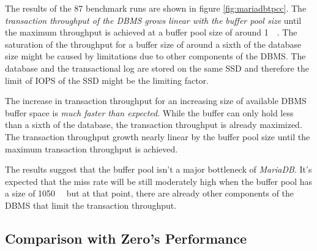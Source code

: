 	The results of the \num{87} benchmark runs are shown in figure \ref{fig:mariadbtpcc}. The \emph{transaction throughput of the DBMS grows linear with the buffer pool size} until the maximum throughput is achieved at a buffer pool size of around \SI{1}{\gibi\byte}. The saturation of the throughput for a buffer size of around a sixth of the database size might be caused by limitations due to other components of the DBMS. The database and the transactional log are stored on the same SSD and therefore the limit of IOPS of the SSD might be the limiting factor.

	The increase in transaction throughput for an increasing size of available DBMS buffer space is \emph{much faster than expected}. While the buffer can only hold less than a sixth of the database, the transaction throughput is already maximized. The transaction throughput growth nearly linear by the buffer pool size until the maximum transaction throughput is achieved.
	
	The results suggest that the buffer pool isn't a major bottleneck of \emph{MariaDB}. It's expected that the miss rate will be still moderately high when the buffer pool has a size of \SI{1050}{\mebi\byte} but at that point, there are already other components of the DBMS that limit the transaction throughput. 
		
\subsection{Comparison with Zero's Performance}

